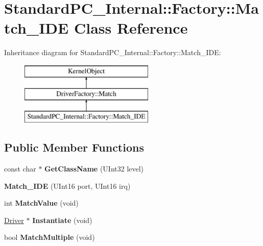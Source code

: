 \hypertarget{class_standard_p_c___internal_1_1_factory_1_1_match___i_d_e}{}\section{Standard\+P\+C\+\_\+\+Internal\+:\+:Factory\+:\+:Match\+\_\+\+I\+DE Class Reference}
\label{class_standard_p_c___internal_1_1_factory_1_1_match___i_d_e}
Inheritance diagram for Standard\+P\+C\+\_\+\+Internal\+:\+:Factory\+:\+:Match\+\_\+\+I\+DE\+:\begin{figure}[H]
\begin{center}
\leavevmode
\includegraphics[height=3.000000cm]{class_standard_p_c___internal_1_1_factory_1_1_match___i_d_e}
\end{center}
\end{figure}
\subsection*{Public Member Functions}
\begin{DoxyCompactItemize}
\item 
\mbox{\label{class_standard_p_c___internal_1_1_factory_1_1_match___i_d_e_ab256ab7d7784a3071685962303837240}} 
const char $\ast$ {\bfseries Get\+Class\+Name} (U\+Int32 level)
\item 
\mbox{\label{class_standard_p_c___internal_1_1_factory_1_1_match___i_d_e_a8cb5667888290bdc1dacf7cbae5ad3e2}} 
{\bfseries Match\+\_\+\+I\+DE} (U\+Int16 port, U\+Int16 irq)
\item 
\mbox{\label{class_standard_p_c___internal_1_1_factory_1_1_match___i_d_e_a4c33c403553a49f81f81ccb3852106a5}} 
int {\bfseries Match\+Value} (void)
\item 
\mbox{\label{class_standard_p_c___internal_1_1_factory_1_1_match___i_d_e_a9e67b99ccaff365b022bc98cedddabc0}} 
\hyperlink{class_driver}{Driver} $\ast$ {\bfseries Instantiate} (void)
\item 
\mbox{\label{class_standard_p_c___internal_1_1_factory_1_1_match___i_d_e_a06525b951739f2a9208e8e5cc0365052}} 
bool {\bfseries Match\+Multiple} (void)
\end{DoxyCompactItemize}
